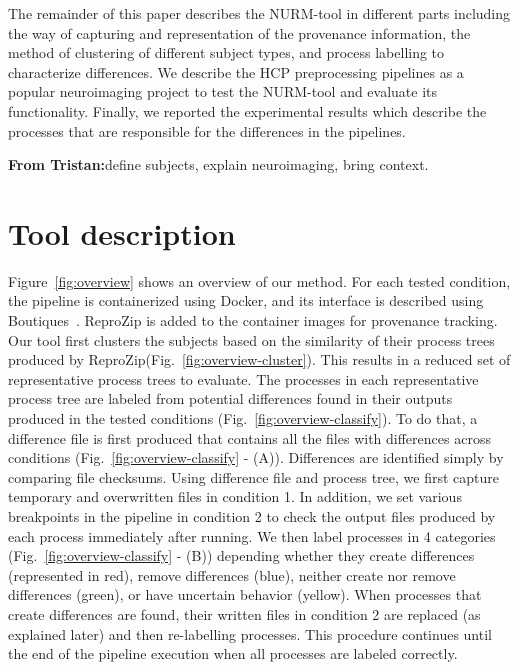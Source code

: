 \documentclass[a4paper,num-refs]{oup-contemporary}
\newcommand{\reprozip}[0]{ReproZip\xspace}
\newcommand{\tristan}[1]{\color{blue}\textbf{From Tristan:}#1\color{black}}
\begin{document}
The remainder of this paper describes the NURM-tool in different parts 
including the way of capturing and representation of the provenance 
information, the method of clustering of different subject types, and 
process labelling to characterize differences. We describe the HCP 
preprocessing pipelines as a popular neuroimaging project to test the 
NURM-tool and evaluate its functionality. Finally, we reported the 
experimental results which describe the processes that are responsible 
for the differences in the pipelines.

\tristan{define subjects, explain neuroimaging, bring context.}
\section{Tool description}

Figure~\ref{fig:overview} shows an overview of our method. For each 
tested condition, the pipeline is containerized using Docker, and its 
interface is described using Boutiques~\cite{glatard2017boutiques}. 
\reprozip is added to the container images for provenance tracking. Our 
tool first clusters the subjects based on the similarity of their 
process trees produced by \reprozip (Fig.~\ref{fig:overview-cluster}). 
This results in a reduced set of representative process trees to 
evaluate. The processes in each representative process tree are labeled 
from potential differences found in their outputs produced in the 
tested conditions (Fig.~\ref{fig:overview-classify}). To do that, a 
difference file is first produced that contains all the files with 
differences across conditions (Fig.~\ref{fig:overview-classify} - (A)). 
Differences are identified simply by comparing file checksums. 
Using difference file and process tree, we first capture temporary and 
overwritten files in condition 1. In addition, we set various 
breakpoints in the pipeline in condition 2 to check the output files 
produced by each process immediately after running. We then label processes in 4 
categories (Fig.~\ref{fig:overview-classify} - (B)) depending whether 
they create differences (represented in red), remove differences 
(blue), neither create nor remove differences (green), or have 
uncertain behavior (yellow). When processes that create differences are 
found, their written files in condition 2 are replaced (as explained 
later) and then re-labelling processes. This procedure 
continues until the end of the pipeline execution when all processes 
are labeled correctly. 
\end{document}
